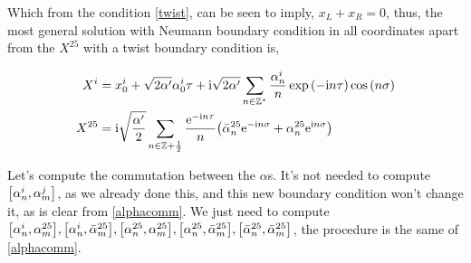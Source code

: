 Which from the condition \ref{twist}, can be seen to imply, $x_L+x_R=0$, thus, the most general solution with Neumann boundary condition in all coordinates apart from the $X^{25}$ 
with a twist boundary condition is,

\begin{align*}
    X^i&=x_0^i+\sqrt{2\alpha'} \alpha_0^i\tau+\textnormal{i}\sqrt{2\alpha'}\sum\limits_{n\in\mathbb Z^\ast}\frac{\alpha_n^i}{n}\exp\qty(-\textnormal{i} n\tau)\cos\qty(n\sigma)\\
    X^{25}&=\textnormal{i}\sqrt{\frac{\alpha'}{2}}\sum\limits_{n\in\mathbb Z+\frac12}\frac{\textnormal{e}^{-\textnormal{i} n\tau}}{n}\qty({\bar\alpha}_n^{25}\textnormal{e}^{-\textnormal{i} n\sigma}+\alpha_n^{25}\textnormal{e}^{\textnormal{i} n\sigma})
\end{align*}

\probitem{}

Let's compute the commutation between the $\alpha$s. It's not needed to compute $\comm{\alpha_n^i}{\alpha_m^j}$, as we already done this, and this new boundary condition won't change it, as 
is clear from \ref{alphacomm}. We just need to compute $\comm{\alpha_n^i}{\alpha_m^{25}},\comm{\alpha_n^i}{{\bar\alpha}_m^{25}},\comm{\alpha_n^{25}}{\alpha_m^{25}},\comm{\alpha_n^{25}}{{\bar\alpha}_m^{25}},\comm{{\bar\alpha}_n^{25}}{{\bar\alpha}_m^{25}}$, 
the procedure is the same of \ref{alphacomm}.

\probitem{}